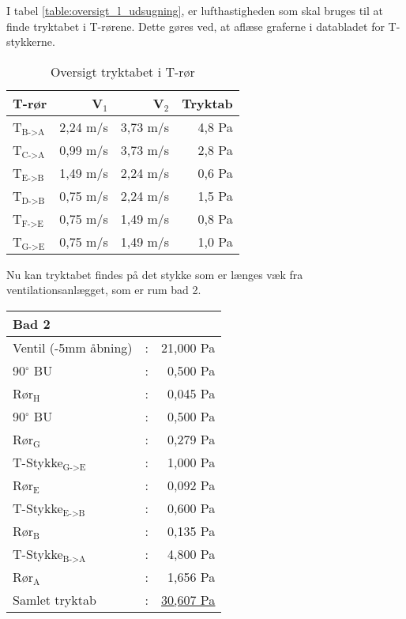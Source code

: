 I tabel \ref{table:oversigt_l_udsugning}, er lufthastigheden som skal bruges til at finde tryktabet i T-rørene.
Dette gøres ved, at aflæse graferne i databladet for T-stykkerne.
\begin{table}[h!]
    \begin{center}
       \begin{tabular}{|l|r|r|r|}
           \hline
           T-rør & V$_{1}$ & V$_{2}$ & Tryktab \\
           \hline
           T$_{\text{B->A}}$ & 2,24 m/s & 3,73 m/s & 4,8 Pa \\ 
           T$_{\text{C->A}}$ & 0,99 m/s & 3,73 m/s & 2,8 Pa \\
           T$_{\text{E->B}}$ & 1,49 m/s & 2,24 m/s & 0,6 Pa \\
           T$_{\text{D->B}}$ & 0,75 m/s & 2,24 m/s & 1,5 Pa \\
           T$_{\text{F->E}}$ & 0,75 m/s & 1,49 m/s & 0,8 Pa \\
           T$_{\text{G->E}}$ & 0,75 m/s & 1,49 m/s & 1,0 Pa \\
           \hline
       \end{tabular}
   \end{center}
   \caption{Oversigt tryktabet i T-rør}
   \label{table:oversigt_tryktab_t-roer}
\end{table}
Nu kan tryktabet findes på det stykke som er længes væk fra ventilationsanlægget, 
som er rum bad 2.
\begin{table}[h!]
    \begin{center}
       \begin{tabular}{lcr}
           \hline
           \hline
           \textbf{Bad 2} &  & \\
           \hline
           \hline
           Ventil (-5mm åbning) & : & 21,000 Pa \\
           90$^\circ$ BU    & : & 0,500 Pa \\
           Rør$_{\text{H}}$ & : & 0,045 Pa \\
           90$^\circ$ BU    & : & 0,500 Pa \\
           Rør$_{\text{G}}$ & : & 0,279 Pa \\
           T-Stykke$_{\text{G->E}}$  & : & 1,000 Pa\\
           Rør$_{\text{E}}$ & : & 0,092 Pa \\
           T-Stykke$_{\text{E->B}}$  & : & 0,600 Pa\\
           Rør$_{\text{B}}$ & : & 0,135 Pa \\
           T-Stykke$_{\text{B->A}}$  & : & 4,800 Pa\\
           Rør$_{\text{A}}$ & : & 1,656 Pa \\
           \hline
           Samlet tryktab    & : & \underline{\underline{ 30,607 Pa}} 
       \end{tabular}
   \end{center}
\end{table}

